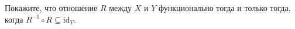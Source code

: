 Покажите, что отношение $R$ между $X$ и $Y$ функционально тогда и только тогда, когда $R^{-1} \circ R
\subseteq \mathrm{id}_Y$.

